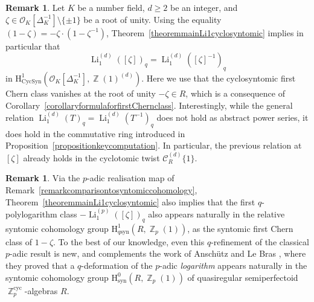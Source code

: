 \documentclass[10pt,twoside]{scrarticle}
\newlength{\mar} \setlength{\mar}{1cm}%
\newlength{\len}
\theoremstyle{definition}
\newtheorem{remark}[theorem]{Remark}
\DeclareMathOperator{\Z}{\mathbb{Z}}
\newcommand{\Li}{\operatorname{Li}}
\newcommand{\nbrrg}{\mathcal{O}_K[\Delta_K^{-1}]}
\newcommand{\CR}{\mathcal{C}_{R}}
\newcommand{\Cyc}{\mathrm{cyc}}
\newcommand{\CycSyn}{\mathrm{CycSyn}}
\renewcommand{\ge}{\geqslant}
\numberwithin{equation}{theorem}
\begin{document}
\begin{remark}
    Let $K$ be a number field, $d \ge 2$ be an integer, and $\zeta \in \nbrrg\setminus\{\pm 1\}$ be a root of unity. Using the equality $(1-\zeta) = -\zeta \cdot (1-\zeta^{-1})$, Theorem~\ref{theoremmainLi1cyclosyntomic} implies in particular that
    $$\Li_1^{(d)}([\zeta])_q = \Li_1^{(d)}([\zeta]^{-1})_q$$
    in $\text{H}^1_{\CycSyn}(\nbrrg,\Z(1)^{(d)})$.
    Here we use that the cyclosyntomic first Chern class vanishes at the root of unity $-\zeta \in R$, which is a consequence of Corollary~\ref{corollaryformulaforfirstChernclass}. Interestingly, while the general relation $\Li_1^{(d)}(T)_q = \Li_1^{(d)}(T^{-1})_q$ does not hold as abstract power series, it does hold in the commutative ring introduced in Proposition~\ref{propositionkeycomputation}. In particular, the previous relation at $[\zeta]$ already holds in the cyclotomic twist $\CR^{(d)}\{1\}$.
\end{remark}

\begin{remark}\label{remarkpadicqpolylogarithminsyntomiccohomology}
    Via the $p$-adic realisation map of Remark~\ref{remarkcomparisontosyntomiccohomology}, Theorem~\ref{theoremmainLi1cyclosyntomic} also implies that the first $q$-polylogarithm class $-\Li_1^{(p)}([\zeta])_q$ also appears naturally in the relative syntomic cohomology group $\text{H}^1_{q\text{syn}}(R,\Z_p(1))$, as the syntomic first Chern class of $1-\zeta$. To the best of our knowledge, even this $q$-refinement of the classical $p$-adic result is new, and complements the work of Anschütz and Le Bras \cite{anschutz_p-completed_2020}, where they proved that a $q$-deformation of the $p$-adic \emph{logarithm} appears naturally in the syntomic cohomology group $\text{H}^0_{\text{syn}}(R,\Z_p(1))$ of quasiregular semiperfectoid $\Z_p^{\Cyc}$-algebras $R$.
\end{remark}


	
	
	
	{\footnotesize

}
	
	
\end{document}
